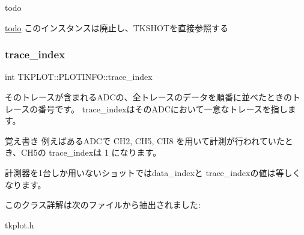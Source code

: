 \begin{DoxyRefDesc}{todo}
\item[\hyperlink{todo__todo000006}{todo}]このインスタンスは廃止し、\+T\+K\+S\+H\+O\+Tを直接参照する \end{DoxyRefDesc}
\mbox{\label{class_t_k_p_l_o_t_1_1_p_l_o_t_i_n_f_o_a48ef8281322bf15a1e48cca923d34eeb}} 
\subsubsection{\texorpdfstring{trace\+\_\+index}{trace\_index}}
{\footnotesize\ttfamily int T\+K\+P\+L\+O\+T\+::\+P\+L\+O\+T\+I\+N\+F\+O\+::trace\+\_\+index}



そのトレースが含まれる\+A\+D\+Cの、全トレースのデータを順番に並べたときのトレースの番号です。 trace\+\_\+indexはその\+A\+D\+Cにおいて一意なトレースを指します。 

\begin{DoxyNote}{覚え書き}
例えばある\+A\+D\+Cで C\+H2, C\+H5, C\+H8 を用いて計測が行われていたとき、\+C\+H5の trace\+\_\+indexは 1 になります。 

計測器を1台しか用いないショットではdata\+\_\+indexと trace\+\_\+indexの値は等しくなります。 
\end{DoxyNote}


このクラス詳解は次のファイルから抽出されました\+:\begin{DoxyCompactItemize}
\item 
tkplot.\+h\end{DoxyCompactItemize}
